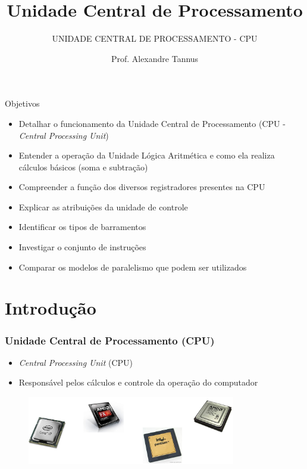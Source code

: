\documentclass[aspectratio=169,
				xcolor=table]{beamer}
\institute[]{\uppercase{Engenharia de Software}}
\title[]{Unidade Central de Processamento}
\subtitle[]{\uppercase{Unidade Central de Processamento - CPU}}
\author[]{Prof. Alexandre Tannus}
\date{}
\begin{document}
	\begin{frame}
		\titlepage
	\end{frame}
	\begin{frame}{Objetivos}
		\begin{itemize}
			\item Detalhar o funcionamento da Unidade Central de Processamento (CPU - \textit{Central Processing Unit})
			\vspace{0.35em}
			\item Entender a operação da Unidade Lógica Aritmética e como ela realiza cálculos básicos (soma e subtração)
			\vspace{0.35em}
			\item Compreender a função dos diversos registradores presentes na CPU
			\vspace{0.35em}
			\item Explicar as atribuições da unidade de controle
			\vspace{0.35em}
			\item Identificar os tipos de barramentos 
			\vspace{0.35em}
			\item Investigar o conjunto de instruções 
			\vspace{0.35em}
			\item Comparar os modelos de paralelismo que podem ser utilizados
		\end{itemize}
	\end{frame}

	\begin{frame}
		\tableofcontents		
	\end{frame}	
	
	\section{Introdução}
	\begin{frame}
		\frametitle{Unidade Central de Processamento (CPU)}
		\begin{itemize}
			\item \textit{Central Processing Unit} (CPU)
			\vspace{1em}
			\item Responsável pelos cálculos e controle da operação do computador

		\end{itemize}
		\begin{figure}
			\centering
			\includegraphics[height=3cm, keepaspectratio]{../figs/cap05/processadores.png} 
		\end{figure}
	\end{frame}
	
\end{document}
